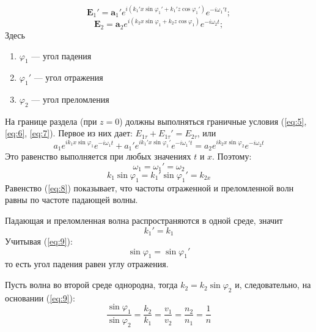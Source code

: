 \documentclass[a4paper, 12pt]{article}
\begin{document}
	\begin{equation}
		\boldsymbol{E}_1'=\boldsymbol{a}_1'e^{i\left(k_1'x\sin\varphi_1' + k_1'z\cos \varphi_1' \right)}e^{-i\omega_1' t};
		\label{eq:6}
	\end{equation}
	\begin{equation}
		\boldsymbol{E}_2=\boldsymbol{a}_2e^{i\left(k_2x\sin\varphi_1 + k_2z\cos \varphi_1 \right)}e^{-i\omega_2 t};
		\label{eq:7}
	\end{equation}
	Здесь
	\begin{enumerate}
		\item $\varphi_1$ — угол падения
		\item $\varphi_1'$ — угол отражения
		\item $\varphi_2$ — угол преломления
	\end{enumerate}
	\par
	На границе раздела (при $z=0$) должны выполняться граничные условия (\ref{eq:5}, \ref{eq:6}, \ref{eq:7}). Первое из них дает: $E_{1\tau}+E_{1\tau}'=E_{2\tau}$, или
	\begin{equation*}
		a_1e^{ik_1x\sin\varphi_1}e^{-i\omega_1 t}+a_1'e^{ik_1'x\sin\varphi_1'}e^{-i\omega_1' t}=a_2e^{ik_2x\sin\varphi_2}e^{-i\omega_2 t}
	\end{equation*}
	Это равенство выполняется при любых значениях $t$ и $x$. Поэтому:
	\begin{equation}
		\omega_1=\omega_1'=\omega_2
		\label{eq:8}
	\end{equation}
	\begin{equation}
		k_1\sin\varphi_1=k_1'\sin\varphi_1'=k_{2x}
		\label{eq:9}
	\end{equation}
	Равенство (\ref{eq:8}) показывает, что частоты отраженной и преломленной волн равны по частоте падающей волны.\par
	Падающая и преломленная волна распространяются в одной среде, значит
	\begin{equation}
		k_1'=k_1
	\end{equation}
	Учитывая (\ref{eq:9}):
	\begin{equation}
		\sin\varphi_1=\sin\varphi_1'
	\end{equation}
	то есть угол падения равен углу отражения.\par
	Пусть волна во второй среде однородна, тогда $k_2=k_2\sin\varphi_2$ и, следовательно, на основании (\ref{eq:9}):
	\begin{equation}
		\frac{\sin\varphi_1}{\sin\varphi_2}=\frac{k_2}{k_1}=\frac{v_1}{v_2}=\frac{n_2}{n_1}=\frac{1}{n}
		\label{eq:12}
	\end{equation}
\end{document}
